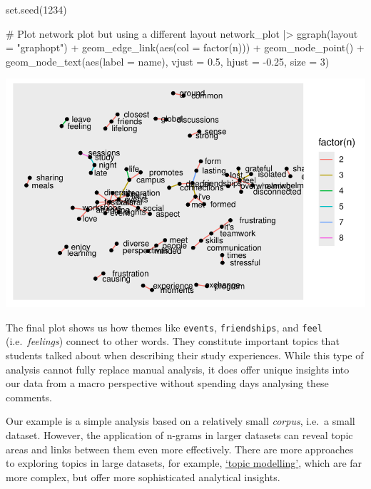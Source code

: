 \documentclass[
  letterpaper,
  DIV=11,
  numbers=noendperiod]{scrreprt}
\newenvironment{Shaded}{\begin{snugshade}}{\end{snugshade}}
\newcommand{\AttributeTok}[1]{\textcolor[rgb]{0.40,0.45,0.13}{#1}}
\newcommand{\CommentTok}[1]{\textcolor[rgb]{0.37,0.37,0.37}{#1}}
\newcommand{\DecValTok}[1]{\textcolor[rgb]{0.68,0.00,0.00}{#1}}
\newcommand{\FloatTok}[1]{\textcolor[rgb]{0.68,0.00,0.00}{#1}}
\newcommand{\FunctionTok}[1]{\textcolor[rgb]{0.28,0.35,0.67}{#1}}
\newcommand{\NormalTok}[1]{\textcolor[rgb]{0.00,0.23,0.31}{#1}}
\newcommand{\SpecialCharTok}[1]{\textcolor[rgb]{0.37,0.37,0.37}{#1}}
\newcommand{\StringTok}[1]{\textcolor[rgb]{0.13,0.47,0.30}{#1}}
\begin{document}
\begin{Shaded}
\begin{Highlighting}[]
\FunctionTok{set.seed}\NormalTok{(}\DecValTok{1234}\NormalTok{)}

\CommentTok{\# Plot network plot but using a different layout}
\NormalTok{network\_plot }\SpecialCharTok{|\textgreater{}}
  \FunctionTok{ggraph}\NormalTok{(}\AttributeTok{layout =} \StringTok{"graphopt"}\NormalTok{) }\SpecialCharTok{+}
  \FunctionTok{geom\_edge\_link}\NormalTok{(}\FunctionTok{aes}\NormalTok{(}\AttributeTok{col =} \FunctionTok{factor}\NormalTok{(n))) }\SpecialCharTok{+}
  \FunctionTok{geom\_node\_point}\NormalTok{() }\SpecialCharTok{+}
  \FunctionTok{geom\_node\_text}\NormalTok{(}\FunctionTok{aes}\NormalTok{(}\AttributeTok{label =}\NormalTok{ name),}
                 \AttributeTok{vjust =} \FloatTok{0.5}\NormalTok{,}
                 \AttributeTok{hjust =} \SpecialCharTok{{-}}\FloatTok{0.25}\NormalTok{,}
                 \AttributeTok{size =} \DecValTok{3}\NormalTok{)}
\end{Highlighting}
\end{Shaded}

\includegraphics{14_mixed_methods_files/figure-pdf/ngrams-network-plot-step-four-1.pdf}

The final plot shows us how themes like \texttt{events},
\texttt{friendships}, and \texttt{feel} (i.e.~\emph{feelings}) connect
to other words. They constitute important topics that students talked
about when describing their study experiences. While this type of
analysis cannot fully replace manual analysis, it does offer unique
insights into our data from a macro perspective without spending days
analysing these comments.

Our example is a simple analysis based on a relatively small
\emph{corpus}, i.e.~a small dataset. However, the application of n-grams
in larger datasets can reveal topic areas and links between them even
more effectively. There are more approaches to exploring topics in large
datasets, for example,
\href{https://www.tidytextmining.com/topicmodeling.html}{`topic
modelling'}, which are far more complex, but offer more sophisticated
analytical insights.
\end{document}
